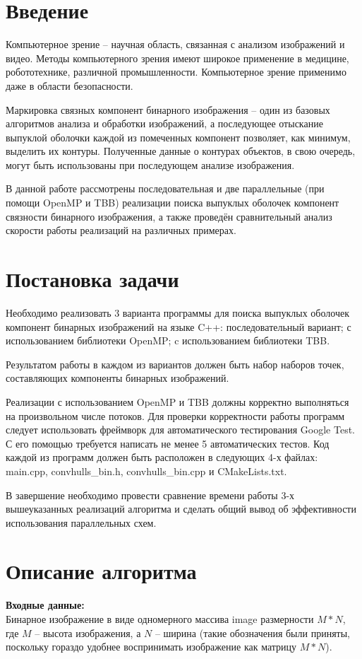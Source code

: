 \documentclass[14pt, russian]{extarticle}
\begin{document}
	\pagestyle{plain}
	\setcounter{page}{3}

	\section{Введение}
	Компьютерное зрение – научная область, связанная с анализом изображений и видео. Методы компьютерного зрения имеют широкое применение в медицине, робототехнике, различной промышленности. Компьютерное зрение применимо даже в области безопасности.
	
	Маркировка связных компонент бинарного изображения – один из базовых алгоритмов анализа и обработки изображений, а последующее отыскание выпуклой оболочки каждой из помеченных компонент позволяет, как минимум, выделить их контуры. Полученные данные о контурах объектов, в свою очередь, могут быть использованы при последующем анализе изображения.

	В данной работе рассмотрены последовательная и две параллельные (при помощи OpenMP и TBB) реализации поиска выпуклых оболочек компонент связности бинарного изображения, а также проведён сравнительный анализ скорости работы реализаций на различных примерах.
	\newpage

	\section{Постановка задачи}
	Необходимо реализовать 3 варианта программы для поиска выпуклых оболочек компонент бинарных изображений на языке C++: последовательный вариант; с использованием библиотеки OpenMP; c использованием библиотеки TBB.
	
	Результатом работы в каждом из вариантов должен быть набор наборов точек, составляющих компоненты бинарных изображений.
	
	Реализации с использованием OpenMP и TBB должны корректно выполняться на произвольном числе потоков. Для проверки корректности работы программ следует использовать фреймворк для автоматического тестирования Google Test. С его помощью требуется написать не менее 5 автоматических тестов. Код каждой из программ должен быть расположен в следующих 4-х файлах: main.cpp, convhulls\_bin.h, convhulls\_bin.cpp и CMakeLists.txt.
	
	В завершение необходимо провести сравнение времени работы 3-х вышеуказанных реализаций алгоритма и сделать общий вывод об эффективности использования параллельных схем.
	
	\newpage

	\section{Описание алгоритма}
	\noindent\textbf{Входные данные:}\\
	\indent Бинарное изображение в виде одномерного массива image размерности $ M * N $, где $ M $ – высота изображения, а $ N $ – ширина (такие обозначения были приняты, поскольку гораздо удобнее воспринимать изображение как матрицу $ M * N $).
	
\end{document}
